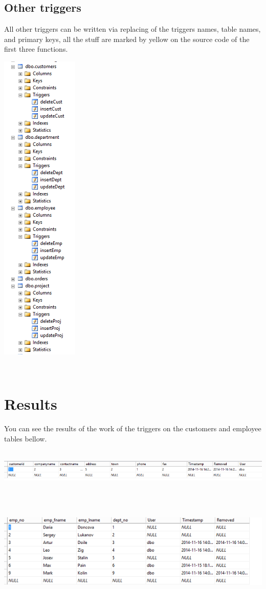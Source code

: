 \documentclass[english]{article}
\begin{document}
\subsection{Other triggers}
All other triggers can be written via replacing of the triggers names, table names, and primary keys, all the stuff are marked by yellow on the source code of the first three functions.
\\
\centerline{\includegraphics[scale=1]{triggers/struct}}\\
\section{Results}
You can see the results of the work of the triggers on the customers and employee tables bellow.
\\
\\
\centerline{\includegraphics[scale=0.8]{triggers/customers}}\\\\
\centerline{\includegraphics[scale=1]{triggers/employee}}\\
\end{document}
